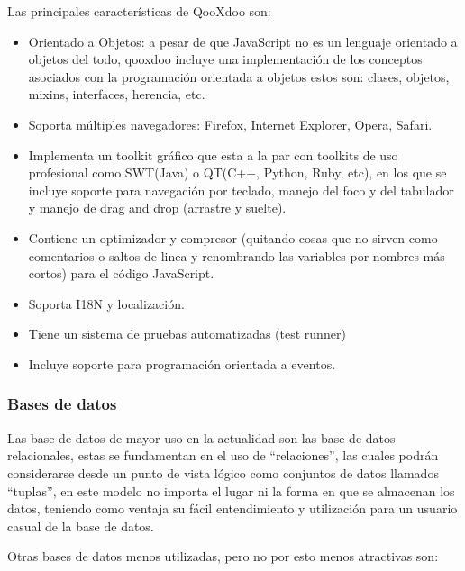 Las principales características de QooXdoo son:

\begin{itemize}

	\item Orientado a Objetos: a pesar de que JavaScript no es un lenguaje orientado a objetos del todo, qooxdoo incluye una implementación de los conceptos asociados con la programación orientada a objetos estos son: clases, objetos, mixins, interfaces, herencia, etc.
	
	\item Soporta múltiples navegadores: Firefox, Internet Explorer, Opera, Safari.
	
	\item Implementa un toolkit gráfico que esta a la par con toolkits de uso profesional como SWT(Java) o QT(C++, Python, Ruby, etc), en los que se incluye soporte para navegación por teclado, manejo del foco y del tabulador y manejo de drag and drop (arrastre y suelte).
	
	\item Contiene un optimizador y compresor (quitando cosas que no sirven como comentarios o saltos de linea y renombrando las variables por nombres más cortos) para el código JavaScript.
	
	\item Soporta I18N y localización.
	
	\item Tiene un sistema de pruebas automatizadas (test runner)
	
	\item Incluye soporte para programación orientada a eventos.

\end{itemize}


\subsubsection*{Bases de datos}

Las base de datos de mayor uso en la actualidad son las base de datos relacionales, estas se fundamentan en el uso de ``relaciones'', las cuales podrán considerarse desde un punto de vista lógico como conjuntos de datos llamados ``tuplas'', en este modelo no importa el lugar ni la forma en que se almacenan los datos, teniendo como ventaja su fácil entendimiento y utilización para un usuario casual de la base de datos.

Otras bases de datos menos utilizadas, pero no por esto menos atractivas son:

